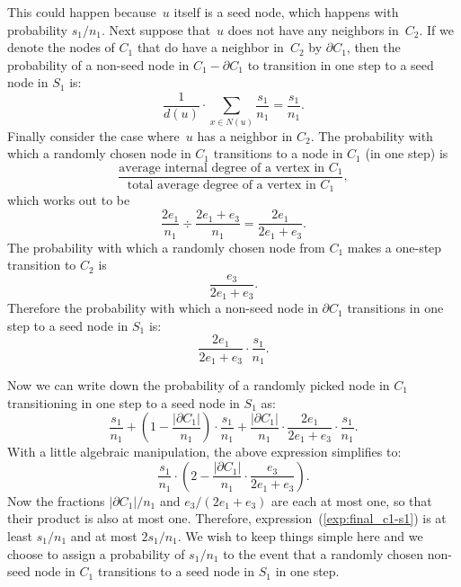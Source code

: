 This could happen because~$u$ itself is a seed node, which happens with probability $s_1 / n_1$.
Next suppose that~$u$ does not have any neighbors in~$C_2$. If we denote the nodes 
of $C_1$ that do have a neighbor in~$C_2$ by $\partial C_1$, then the probability 
of a non-seed node in $C_1 - \partial C_1$ to transition in one step to a seed 
node in $S_1$ is:
\begin{equation}
    \frac{1}{d(u)} \cdot \sum_{x \in N(u)} \frac{s_1}{n_1} = \frac{s_1}{n_1}.
\end{equation}
Finally consider the case where~$u$ has a neighbor in $C_2$. The probability with 
which a randomly chosen node in $C_1$ transitions to a node in $C_1$ (in one step) is 
\[
    \frac{\mbox{average internal degree of a vertex in $C_1$}}
         {\mbox{total average degree of a vertex in $C_1$}},
\]
which works out to be 
\begin{equation}\label{exp:c1-c1}
    \frac{2e_1}{n_1} \div \frac{2e_1 + e_3}{n_1} = \frac{2e_1}{2e_1 + e_3}.
\end{equation}
The probability with which a randomly chosen node from $C_1$ makes a 
one-step transition to $C_2$ is 
\begin{equation}\label{exp:c1-c2}
    \frac{e_3}{2e_1 + e_3}.
\end{equation}
Therefore the probability with which a non-seed node in $\partial C_1$ 
transitions in one step to a seed node in $S_1$ is:
\begin{equation}
    \frac{2e_1}{2e_1 + e_3} \cdot \frac{s_1}{n_1}.
\end{equation}

Now we can write down the probability of a randomly picked 
node in $C_1$ transitioning in one step to a seed node in $S_1$
as:
\begin{equation}\label{exp:c1-s1}
    \frac{s_1}{n_1} +  \left ( 1 - \frac{|\partial C_1|}{n_1} \right ) \cdot \frac{s_1}{n_1} 
            + \frac{|\partial C_1|}{n_1} \cdot \frac{2e_1}{2e_1 + e_3} \cdot \frac{s_1}{n_1}.
\end{equation}
With a little algebraic manipulation, the above expression simplifies to: 
\begin{equation}\label{exp:final_c1-s1}
    \frac{s_1}{n_1} \cdot \left ( 2 - \frac{|\partial C_1|}{n_1} \cdot \frac{e_3}{2e_1 + e_3} \right ).
\end{equation}
Now the fractions $|\partial C_1| / n_1$ and $e_3/ (2e_1 + e_3)$ are each 
at most one, so that their product is also at most one. Therefore, 
expression~(\ref{exp:final_c1-s1}) is at least $s_1/ n_1$ and 
at most $2s_1 / n_1$. We wish to keep things simple here and we 
choose to assign a probability of $s_1 / n_1$ to the event that 
a randomly chosen non-seed node in $C_1$ transitions to a seed node
in $S_1$ in one step.

